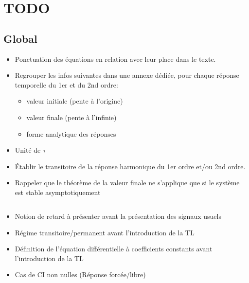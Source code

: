 \chapter{TODO}

\section{Global}
\begin{itemize}
\item Ponctuation des équations en relation avec leur place dans le texte.
\item Regrouper les infos suivantes dans une annexe dédiée, pour chaque réponse temporelle du 1er et du 2nd ordre:
    \begin{itemize}
        \item valeur initiale (pente à l'origine)
        \item valeur finale (pente à l'infinie)
        \item forme analytique des réponses
    \end{itemize}
\item Unité de $\tau$
\item \'Etablir le transitoire de la réponse harmonique du 1er ordre et/ou 2nd ordre.
\item Rappeler que le théorème de la valeur finale ne s'applique que si le système est stable asymptotiquement
\end{itemize}

\section{}     
\begin{itemize}
\item Notion de retard à présenter avant la présentation des signaux usuels
\item Régime transitoire/permanent avant l'introduction de la TL
\item Définition de l'équation différentielle à coefficients constants avant l'introduction de la TL
    \item Cas de CI non nulles (Réponse forcée/libre)
\end{itemize}
\section{}
\section{}
